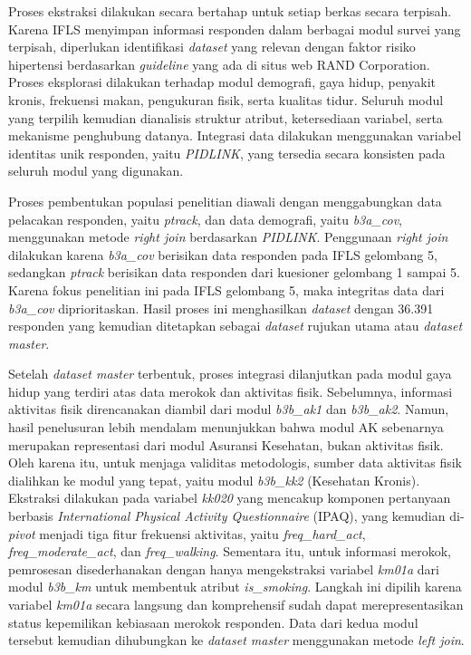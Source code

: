 Proses ekstraksi dilakukan secara bertahap untuk setiap berkas secara terpisah. Karena IFLS menyimpan informasi responden dalam berbagai modul survei yang terpisah, diperlukan identifikasi \textit{dataset} yang relevan dengan faktor risiko hipertensi berdasarkan \textit{guideline} yang ada di situs web RAND Corporation. Proses eksplorasi dilakukan terhadap modul demografi, gaya hidup, penyakit kronis, frekuensi makan, pengukuran fisik, serta kualitas tidur. Seluruh modul yang terpilih kemudian dianalisis struktur atribut, ketersediaan variabel, serta mekanisme penghubung datanya. Integrasi data dilakukan menggunakan variabel identitas unik responden, yaitu \textit{PIDLINK}, yang tersedia secara konsisten pada seluruh modul yang digunakan.

Proses pembentukan populasi penelitian diawali dengan menggabungkan data pelacakan responden, yaitu \textit{ptrack}, dan data demografi, yaitu \textit{b3a\_cov}, menggunakan metode \textit{right join} berdasarkan \textit{PIDLINK}. Penggunaan \textit{right join} dilakukan karena \textit{b3a\_cov} berisikan data responden pada IFLS gelombang 5, sedangkan \textit{ptrack} berisikan data responden dari kuesioner gelombang 1 sampai 5. Karena fokus penelitian ini pada IFLS gelombang 5, maka integritas data dari \textit{b3a\_cov} diprioritaskan. Hasil proses ini menghasilkan \textit{dataset} dengan 36.391 responden yang kemudian ditetapkan sebagai \textit{dataset} rujukan utama atau \textit{dataset master}.

Setelah \textit{dataset master} terbentuk, proses integrasi dilanjutkan pada modul gaya hidup yang terdiri atas data merokok dan aktivitas fisik. Sebelumnya, informasi aktivitas fisik direncanakan diambil dari modul \textit{b3b\_ak1} dan \textit{b3b\_ak2}. Namun, hasil penelusuran lebih mendalam menunjukkan bahwa modul AK sebenarnya merupakan representasi dari modul Asuransi Kesehatan, bukan aktivitas fisik. Oleh karena itu, untuk menjaga validitas metodologis, sumber data aktivitas fisik dialihkan ke modul yang tepat, yaitu modul \textit{b3b\_kk2} (Kesehatan Kronis). Ekstraksi dilakukan pada variabel \textit{kk020} yang mencakup komponen pertanyaan berbasis \textit{International Physical Activity Questionnaire} (IPAQ), yang kemudian di-\textit{pivot} menjadi tiga fitur frekuensi aktivitas, yaitu \textit{freq\_hard\_act}, \textit{freq\_moderate\_act}, dan \textit{freq\_walking}. Sementara itu, untuk informasi merokok, pemrosesan disederhanakan dengan hanya mengekstraksi variabel \textit{km01a} dari modul \textit{b3b\_km} untuk membentuk atribut \textit{is\_smoking}. Langkah ini dipilih karena variabel \textit{km01a} secara langsung dan komprehensif sudah dapat merepresentasikan status kepemilikan kebiasaan merokok responden. Data dari kedua modul tersebut kemudian dihubungkan ke \textit{dataset master} menggunakan metode \textit{left join}.

